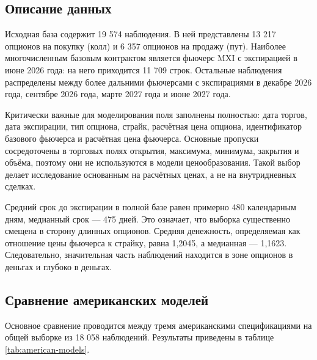 \documentclass[11pt,a4paper]{article}
\begin{document}
\subsection{Описание данных}

Исходная база содержит 19 574 наблюдения. В ней представлены 13 217 опционов на покупку (колл) и 6 357 опционов на продажу (пут). Наиболее многочисленным базовым контрактом является фьючерс MXI с экспирацией в июне 2026 года: на него приходится 11 709 строк. Остальные наблюдения распределены между более дальними фьючерсами с экспирациями в декабре 2026 года, сентябре 2026 года, марте 2027 года и июне 2027 года.

Критически важные для моделирования поля заполнены полностью: дата торгов, дата экспирации, тип опциона, страйк, расчётная цена опциона, идентификатор базового фьючерса и расчётная цена фьючерса. Основные пропуски сосредоточены в торговых полях открытия, максимума, минимума, закрытия и объёма, поэтому они не используются в модели ценообразования. Такой выбор делает исследование основанным на расчётных ценах, а не на внутридневных сделках.

Средний срок до экспирации в полной базе равен примерно 480 календарным дням, медианный срок --- 475 дней. Это означает, что выборка существенно смещена в сторону длинных опционов. Средняя денежность, определяемая как отношение цены фьючерса к страйку, равна 1,2045, а медианная --- 1,1623. Следовательно, значительная часть наблюдений находится в зоне опционов в деньгах и глубоко в деньгах.

\subsection{Сравнение американских моделей}

Основное сравнение проводится между тремя американскими спецификациями на общей выборке из 18 058 наблюдений. Результаты приведены в таблице \ref{tab:american-models}.
\end{document}
